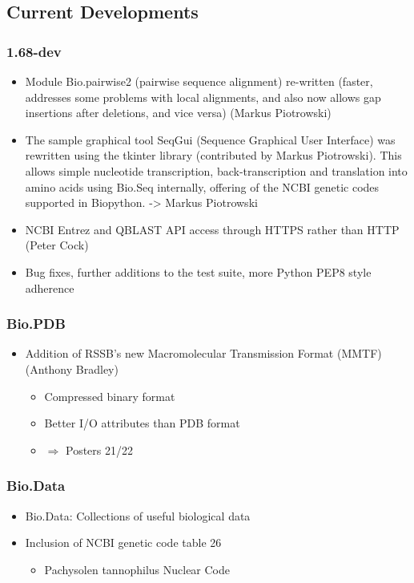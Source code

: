 \documentclass[trans]{beamer}
\begin{document}
\subsection*{Current Developments}
\frame
{
  \frametitle{1.68-dev}

  \begin{itemize}
  \item Module Bio.pairwise2 (pairwise sequence alignment) re-written (faster, addresses some problems with local alignments, and also now allows gap insertions after deletions, and vice versa) (Markus Piotrowski)

  \item The sample graphical tool SeqGui (Sequence Graphical User Interface) was
rewritten using the tkinter library (contributed by Markus Piotrowski). This
allows simple nucleotide transcription, back-transcription and translation
into amino acids using Bio.Seq internally, offering of the NCBI genetic codes
supported in Biopython. -> Markus Piotrowski

  \item NCBI Entrez and QBLAST API access through HTTPS rather than HTTP (Peter Cock)

  \item Bug fixes, further additions to the test suite, more Python PEP8 style adherence

  \end{itemize}
}


\frame
{
  \frametitle{Bio.PDB}
  
  \begin{itemize}
  \item Addition of RSSB's new Macromolecular Transmission Format (MMTF) (Anthony Bradley)
  \begin{itemize}
  \item Compressed binary format
  \item Better I/O attributes than PDB format
  \item $\Rightarrow$ Posters 21/22
  \end{itemize}
  \end{itemize}
}

\frame
{
  \frametitle{Bio.Data}
  
  \begin{itemize}
  \item Bio.Data: Collections of useful biological data
  \item Inclusion of NCBI genetic code table 26
  \begin{itemize}
  \item Pachysolen tannophilus Nuclear Code
  \end{itemize}
  \end{itemize}
}
\end{document}
